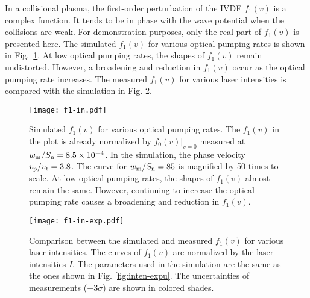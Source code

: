 \documentclass[aip,pop,reprint]{revtex4-1}
\begin{document}
In a collisional plasma, the first-order perturbation of the IVDF $f_1(v)$ is a complex function. It tends to be in phase with the wave potential when the collisions are weak. For demonstration purposes, only the real part of $f_1(v)$ is presented here. The simulated $f_1(v)$ for various optical pumping rates is shown in Fig.~\ref{fig:f1in}. At low optical pumping rates, the shapes of $f_1(v)$ remain undistorted. However, a broadening and reduction in $f_1(v)$ occur as the optical pumping rate increases. The measured $f_1(v)$ for various laser intensities is compared with the simulation in Fig. \ref{fig:f1-in-exp}.

\begin{figure}
\begin{center}
\texttt{[image: f1-in.pdf]}
\caption{Simulated $f_1(v)$ for various optical pumping rates. The $f_1(v)$ in the plot is already normalized by $f_0(v)|_{v=0}$ measured at $w_\textup{m}/S_\textup{n}=8.5\times 10^{-4}$. In the simulation, the phase velocity $v_{\textup{p}}/v_{\textup{t}}=3.8$. The curve for $w_\textup{m}/S_\textup{n}=85$ is magnified by 50 times to scale. At low optical pumping rates, the shapes of $f_1(v)$ almost remain the same. However, continuing to increase the optical pumping rate causes a broadening and reduction in $f_1(v)$.}
\label{fig:f1in}
\end{center}
\end{figure}

\begin{figure}
\begin{center}
\texttt{[image: f1-in-exp.pdf]}
\caption{Comparison between the simulated and measured $f_1(v)$ for various laser intensities. The curves of $f_1(v)$ are normalized by the laser intensities $I$. The parameters used in the simulation are the same as the ones shown in Fig. \ref{fig:inten-expu}. The uncertainties of measurements ($\pm 3 \sigma$) are shown in colored shades.}
\label{fig:f1-in-exp}
\end{center}
\end{figure}

\end{document}
